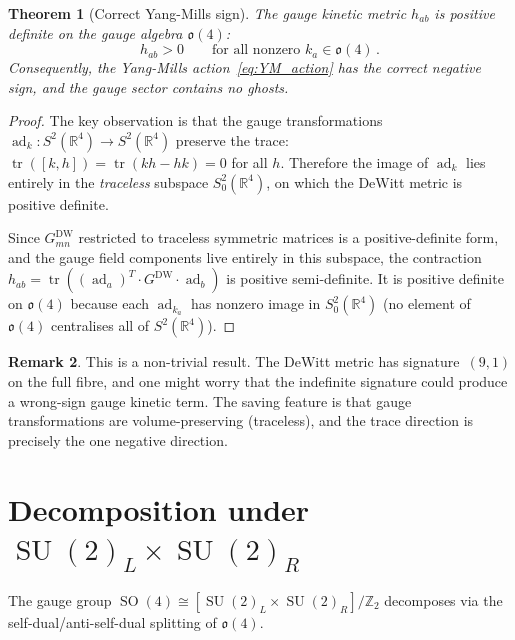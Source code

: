 \documentclass[12pt,a4paper]{article}
\newtheorem{theorem}{Theorem}[section]
\theoremstyle{definition}
\newtheorem{remark}[theorem]{Remark}
\newcommand{\tr}{\operatorname{tr}}
\newcommand{\SO}{\operatorname{SO}}
\newcommand{\SU}{\operatorname{SU}}
\newcommand{\ad}{\operatorname{ad}}
\newcommand{\R}{\mathbb{R}}
\newcommand{\Z}{\mathbb{Z}}
\begin{document}
\begin{theorem}[Correct Yang-Mills sign]
\label{thm:YM_sign}
The gauge kinetic metric $h_{ab}$ is positive definite on the gauge algebra $\mathfrak{o}(4)$:
\begin{equation}
h_{ab} > 0\qquad \text{for all nonzero } k_a \in \mathfrak{o}(4)\,.
\end{equation}
Consequently, the Yang-Mills action~\eqref{eq:YM_action} has the correct negative sign, and the gauge sector contains no ghosts.
\end{theorem}

\begin{proof}
The key observation is that the gauge transformations $\ad_k\colon S^2(\R^4) \to S^2(\R^4)$ preserve the trace: $\tr([k,h]) = \tr(kh - hk) = 0$ for all $h$.
Therefore the image of $\ad_k$ lies entirely in the \emph{traceless} subspace $S^2_0(\R^4)$, on which the DeWitt metric is positive definite.

Since $G^{\mathrm{DW}}_{mn}$ restricted to traceless symmetric matrices is a positive-definite form, and the gauge field components live entirely in this subspace, the contraction $h_{ab} = \tr((\ad_a)^T\! \cdot G^{\mathrm{DW}} \cdot \ad_b)$ is positive semi-definite.
It is positive definite on $\mathfrak{o}(4)$ because each $\ad_{k_a}$ has nonzero image in $S^2_0(\R^4)$ (no element of $\mathfrak{o}(4)$ centralises all of $S^2(\R^4)$).
\end{proof}

\begin{remark}
This is a non-trivial result.
The DeWitt metric has signature~$(9,1)$ on the full fibre, and one might worry that the indefinite signature could produce a wrong-sign gauge kinetic term.
The saving feature is that gauge transformations are volume-preserving (traceless), and the trace direction is precisely the one negative direction.
\end{remark}


\section{Decomposition under \texorpdfstring{$\SU(2)_L \times \SU(2)_R$}{SU(2)L x SU(2)R}}
\label{sec:su2_decomp}

The gauge group $\SO(4) \cong [\SU(2)_L \times \SU(2)_R]/\Z_2$ decomposes via the self-dual/anti-self-dual splitting of $\mathfrak{o}(4)$.
\end{document}
